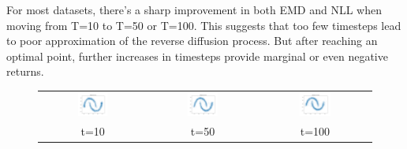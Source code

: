 \documentclass[11pt]{article}
\begin{document}
For most datasets, there's a sharp improvement in both EMD and NLL when moving from T=10 to T=50 or T=100. This suggests that too few timesteps lead to poor approximation of the reverse diffusion process. But after reaching an optimal point, further increases in timesteps provide marginal or even negative returns.


\begin{figure}[H]
    \centering
    \begin{tabular}{ccc}
        \includegraphics[width=0.3\textwidth]{exps/ddpm_2_10_0.0001_0.02_moons/samples_10.png} &
        \includegraphics[width=0.3\textwidth]{exps/ddpm_2_50_0.0001_0.02_moons/samples_50.png} &
        \includegraphics[width=0.3\textwidth]{exps/ddpm_2_100_0.0001_0.02_moons/samples_100.png} \\
        t=10 & t=50 & t=100 \\[0.5em]
        

\end{tabular}
\end{figure}
\end{document}
